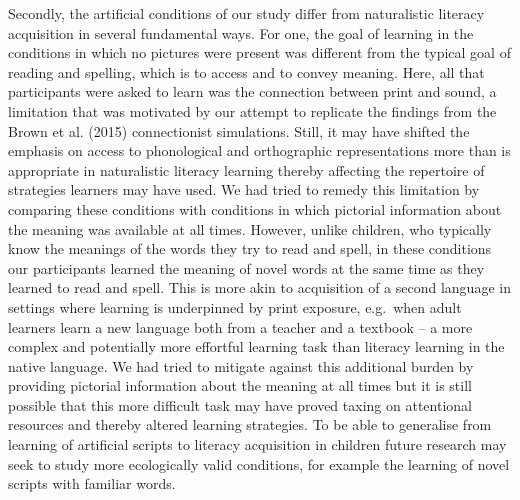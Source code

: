 \documentclass[doc,floatsintext]{apa6}
\begin{document}
Secondly, the artificial conditions of our study differ from
naturalistic literacy acquisition in several fundamental ways. For one,
the goal of learning in the conditions in which no pictures were present
was different from the typical goal of reading and spelling, which is to
access and to convey meaning. Here, all that participants were asked to
learn was the connection between print and sound, a limitation that was
motivated by our attempt to replicate the findings from the Brown et al.
(2015) connectionist simulations. Still, it may have shifted the
emphasis on access to phonological and orthographic representations more
than is appropriate in naturalistic literacy learning thereby affecting
the repertoire of strategies learners may have used. We had tried to
remedy this limitation by comparing these conditions with conditions in
which pictorial information about the meaning was available at all
times. However, unlike children, who typically know the meanings of the
words they try to read and spell, in these conditions our participants
learned the meaning of novel words at the same time as they learned to
read and spell. This is more akin to acquisition of a second language in
settings where learning is underpinned by print exposure, e.g.~when
adult learners learn a new language both from a teacher and a textbook
-- a more complex and potentially more effortful learning task than
literacy learning in the native language. We had tried to mitigate
against this additional burden by providing pictorial information about
the meaning at all times but it is still possible that this more
difficult task may have proved taxing on attentional resources and
thereby altered learning strategies. To be able to generalise from
learning of artificial scripts to literacy acquisition in children
future research may seek to study more ecologically valid conditions,
for example the learning of novel scripts with familiar words.
\end{document}
